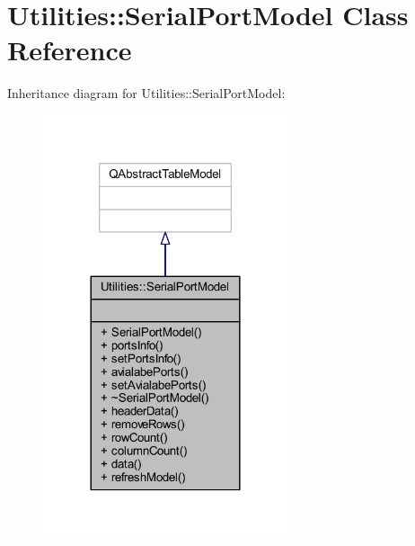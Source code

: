 \hypertarget{class_utilities_1_1_serial_port_model}{}\section{Utilities\+:\+:Serial\+Port\+Model Class Reference}
\label{class_utilities_1_1_serial_port_model}


Inheritance diagram for Utilities\+:\+:Serial\+Port\+Model\+:\nopagebreak
\begin{figure}[H]
\begin{center}
\leavevmode
\includegraphics[width=204pt]{da/d95/class_utilities_1_1_serial_port_model__inherit__graph}
\end{center}
\end{figure}


